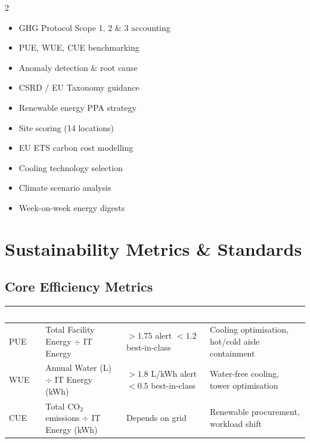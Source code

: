 \documentclass[11pt, a4paper]{article}
\newcommand{\tableheader}[1]{\cellcolor{flaergreen!90}\textcolor{white}{\textbf{\small #1}}}
\begin{document}
\begin{multicols}{2}
\begin{itemize}[leftmargin=1.2em, itemsep=2pt]
  \item GHG Protocol Scope 1, 2 \& 3 accounting
  \item PUE, WUE, CUE benchmarking
  \item Anomaly detection \& root cause
  \item CSRD / EU Taxonomy guidance
  \item Renewable energy PPA strategy
  \item Site scoring (14 locations)
  \item EU ETS carbon cost modelling
  \item Cooling technology selection
  \item Climate scenario analysis
  \item Week-on-week energy digests
\end{itemize}
\end{multicols}

\section{Sustainability Metrics \& Standards}

\subsection{Core Efficiency Metrics}

\begin{tabular}{p{1.8cm} p{4.5cm} p{3cm} p{5cm}}
  \toprule
  \tableheader{Metric} & \tableheader{Formula} & \tableheader{Threshold} & \tableheader{Action} \\
  \midrule
  PUE & Total Facility Energy $\div$ IT Energy & $> 1.75$ alert \newline $< 1.2$ best-in-class & Cooling optimisation, hot/cold aisle containment \\
  \rowcolor{rowalt} WUE & Annual Water (L) $\div$ IT Energy (kWh) & $> 1.8$ L/kWh alert \newline $< 0.5$ best-in-class & Water-free cooling, tower optimisation \\
  CUE & Total CO$_2$ emissions $\div$ IT Energy (kWh) & Depends on grid & Renewable procurement, workload shift \\
  \bottomrule
\end{tabular}
\end{document}
